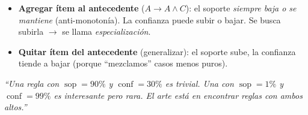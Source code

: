 \documentclass[11pt,a4paper]{article}
\newcommand{\conf}{\operatorname{conf}}
\newcommand{\sop}{\operatorname{sop}}
\begin{document}
\begin{intuicionbox}
\begin{itemize}
    \item \textbf{Agregar ítem al antecedente} ($A \to A \wedge C$): el soporte
          \emph{siempre baja o se mantiene} (anti-monotonía). La confianza puede subir o bajar.
          Se busca subirla $\to$ se llama \emph{especialización}.
    \item \textbf{Quitar ítem del antecedente} (generalizar): el soporte sube, la confianza
          tiende a bajar (porque ``mezclamos'' casos menos puros).
\end{itemize}
\end{intuicionbox}

\vfill
\begin{center}
\small\itshape
``Una regla con $\sop = 90\%$ y $\conf = 30\%$ es trivial. Una con $\sop = 1\%$ y
$\conf = 99\%$ es interesante pero rara. El arte está en encontrar reglas con \emph{ambos
altos}.''
\end{center}
\end{document}
